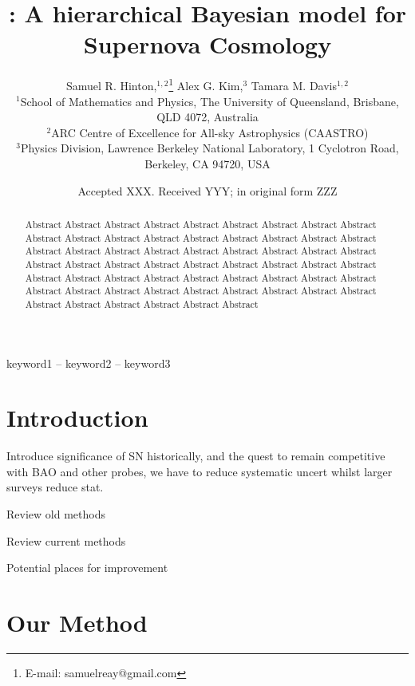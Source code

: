 \documentclass[a4paper,fleqn,usenatbib]{mnras}
\title[\name]{\name: A hierarchical Bayesian model for Supernova Cosmology}
\author[S. R. Hinton et al.]{
	Samuel R. Hinton,$^{1,2}$\thanks{E-mail: samuelreay@gmail.com}
	Alex G. Kim,$^{3}$
	Tamara M. Davis$^{1,2}$
	\\
	$^{1}$School of Mathematics and Physics, The University of Queensland, Brisbane, QLD 4072, Australia\\
	$^{2}$ARC Centre of Excellence for All-sky Astrophysics (CAASTRO)\\
	$^{3}$Physics Division, Lawrence Berkeley National Laboratory, 1 Cyclotron Road, Berkeley, CA 94720, USA
}
\date{Accepted XXX. Received YYY; in original form ZZZ}
\begin{document}
\label{firstpage}
\pagerange{\pageref{firstpage}--\pageref{lastpage}}
\maketitle











\begin{abstract}
Abstract Abstract Abstract Abstract Abstract Abstract Abstract Abstract Abstract Abstract
Abstract Abstract Abstract Abstract Abstract Abstract Abstract Abstract Abstract Abstract
Abstract Abstract Abstract Abstract Abstract Abstract Abstract Abstract Abstract Abstract
Abstract Abstract Abstract Abstract Abstract Abstract Abstract Abstract Abstract Abstract
Abstract Abstract Abstract Abstract Abstract Abstract Abstract Abstract Abstract Abstract
Abstract Abstract Abstract Abstract Abstract Abstract Abstract Abstract Abstract Abstract
\end{abstract}

\begin{keywords}
keyword1 -- keyword2 -- keyword3
\end{keywords}










\section{Introduction}

Introduce significance of SN historically, and the quest to remain competitive with BAO and other probes, we have to reduce systematic uncert whilst larger surveys reduce stat. 

Review old methods

Review current methods

Potential places for improvement

\section{Our Method}
\end{document}

